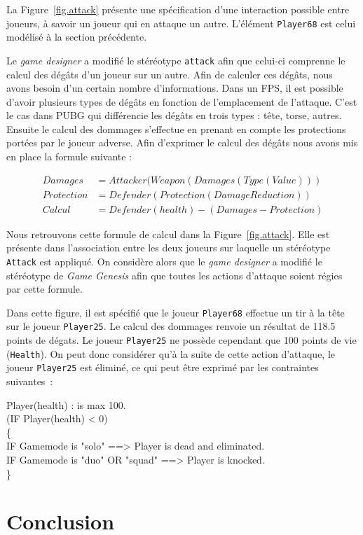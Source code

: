 
La Figure~\ref{fig.attack} présente une sp\'ecification d'une interaction possible entre joueurs, \`a savoir un joueur qui en attaque un autre.
L'élément \texttt{Player68} est celui modélisé \`a la section précédente.

Le \emph{game designer} a modifié le stéréotype \texttt{attack} afin que celui-ci comprenne le calcul des dégâts d'un joueur sur un autre.
Afin de calculer ces dégâts, nous avons besoin d'un certain nombre d'informations.
Dans un FPS, il est possible d'avoir plusieurs types de dégâts en fonction de l'emplacement de l'attaque.
C'est le cas dans PUBG qui différencie les dégâts en trois types : tête, torse, autres.
Ensuite le calcul des dommages s'effectue en prenant en compte les protections portées par le joueur adverse.
Afin d'exprimer le calcul des dégâts nous avons mis en place la formule suivante :

\begin{equation*}
\begin{split}
Damages& = Attacker(Weapon(Damages(Type(Value)))\\
Protection& = Defender(Protection(DamageReduction))\\
Calcul& = Defender(health) - (Damages - Protection)
\end{split}
\end{equation*}




Nous retrouvons cette formule de calcul dans la Figure~\ref{fig.attack}.
Elle est présente dans l'association entre les deux joueurs sur laquelle un stéréotype \texttt{Attack} est appliqué.
On considère alors que le \emph{game designer} a modifié le stéréotype de \emph{Game Genesis} afin que toutes les actions d'attaque soient régies par cette formule.

Dans cette figure, il est spécifié que le joueur \texttt{Player68} effectue un tir à la tête sur le joueur \texttt{Player25}.
Le calcul des dommages renvoie un résultat de 118.5 points de dégats.
Le joueur \texttt{Player25} ne possède cependant que 100 points de vie (\texttt{Health}).
On peut donc considérer qu'à la suite de cette action d'attaque, le joueur \texttt{Player25} est éliminé, 
ce qui peut être exprimé par les contraintes suivantes~: 

{
\footnotesize
\begin{framed}
    Player(health) : is max 100.\\
    (IF Player(health) < 0)\\
    \{\\
    IF Gamemode is "solo" ==> Player is dead and eliminated.\\
    IF Gamemode is "duo" OR "squad" ==> Player is knocked.\\
    \}
\end{framed}
}

\section{Conclusion}
